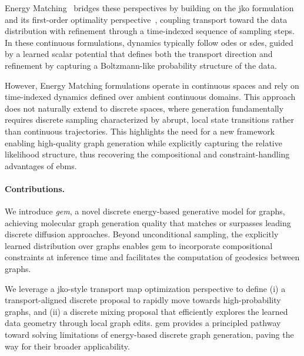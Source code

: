 Energy Matching~\citep{balcerak2025energy} bridges these perspectives by building on the \gls{jko} formulation~\citep{jordan1998variational} and its first-order optimality perspective~\citep{terpin2024learning,lanzetti2024variational,lanzetti2025firstorder}, coupling transport toward the data distribution with refinement through a time-indexed sequence of sampling steps. In these continuous formulations, dynamics typically follow \glspl{ode} or \glspl{sde}, guided by a learned scalar potential that defines both the transport direction and refinement by capturing a Boltzmann-like probability structure of the data. 

However, Energy Matching formulations operate in continuous spaces and rely on time-indexed dynamics defined over ambient continuous domains. This approach does not naturally extend to discrete spaces, where generation fundamentally requires discrete sampling characterized by abrupt, local state transitions rather than continuous trajectories. This highlights the need for a new framework enabling high-quality graph generation while explicitly capturing the relative likelihood structure, thus recovering the compositional and constraint-handling advantages of \glspl{ebm}.

\vspace{0.5em}


\begin{mdframed}[hidealllines=true,backgroundcolor=BurntOrange!8]
\paragraph{Contributions.}
We introduce \emph{\gls{gem}}, a novel discrete energy-based generative model for graphs, achieving molecular graph generation quality that matches or surpasses leading discrete diffusion approaches.  Beyond unconditional sampling, the explicitly learned distribution over graphs enables \gls{gem} to incorporate compositional constraints at inference time and facilitates the computation of geodesics between graphs.

We leverage a \gls{jko}-style transport map optimization perspective to define (i) a transport-aligned discrete proposal to rapidly move towards high-probability graphs, and (ii) a discrete mixing proposal that efficiently explores the learned data geometry through local graph edits. \gls{gem} provides a principled pathway toward solving limitations of energy-based discrete graph generation, paving the way for their broader applicability.
\end{mdframed}
